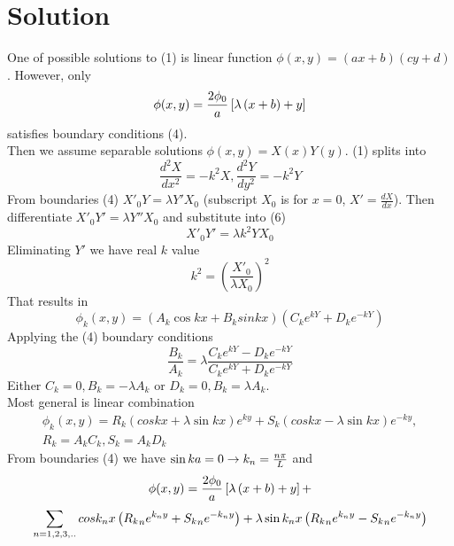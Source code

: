 \documentclass[a4paper]{article}
\begin{document}
\section{Solution}
One of possible solutions to (1) is linear function $\phi(x,y) = (a x + b) ( c y + d) $. However, only 
\begin{equation}
\phi(x,y) = {2 \phi_0 \over a} \left[ \lambda \left( x + b \right)  + y \right]
\end{equation}
satisfies boundary conditions (4). \\
Then we assume separable solutions $\phi(x,y) = X(x) Y(y)$. (1) splits into 
\begin{equation}
\frac{d^2 X}{dx^2} = - k^2 X, \frac{d^2 Y}{dy^2} = - k^2 Y 
\end{equation}
From boundaries (4) $X'_0 Y = \lambda Y' X_0$ (subscript $X_0$ is for $x = 0$, $X' = \frac{dX}{dx}$). Then differentiate $X'_0 Y' = \lambda Y'' X_0$ and substitute into (6)
\begin{equation}
X'_0 Y' = \lambda k^2 Y X_0
\end{equation}
Eliminating $Y'$ we have real $k$ value
\begin{equation}
k^2 = \left( \frac{X'_0}{\lambda X_0} \right) ^2 
\end{equation}
That results in 
\begin{equation}
\phi_k(x,y) = \left(A_k \cos k x + B_k sin k x \right) \left(C_k e^{k Y} + D_k e^{-k Y} \right)
\end{equation}
Applying the (4) boundary conditions 
\begin{equation}
\frac{B_k}{A_k} = \lambda \frac{C_k e^{k Y} - D_k e^{-k Y} }{C_k e^{k Y} + D_k e^{-k Y} }
\end{equation}
Either $C_k = 0, B_k = - \lambda A_k$ or $D_k = 0, B_k = \lambda A_k$. \\
Most general is linear combination 
\begin{equation}
\begin{split}
\phi_k(x,y) = R_k \left( cos k x + \lambda \sin k x \right) e^{k y} + S_k \left( cos k x - \lambda \sin k x \right) e^{-k y}, \\
R_k = A_k C_k, S_k = A_k D_k
\end{split}
\end{equation}
From boundaries (4) we have $\sin k a = 0 \rightarrow k_n = {n \pi \over L}$ and 
\begin{multline}
\phi(x,y) = { 2 \phi_0 \over a} \left[  \lambda  \left( x + b \right) + y \right] + \\ 
\sum_{n = 1,2,3,..}^{}    cos k_n x \left( {R_k}_n e^{k_n y} + {S_k}_n e^{-k_n y} \right) + \lambda \sin k_n x \left( {R_k}_n e^{k_n y} - {S_k}_n e^{-k_n y} \right) 
\end{multline}
\end{document}

